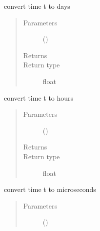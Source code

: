 \documentclass[letterpaper,10pt,english]{sphinxmanual}
\begin{document}
\begin{fulllineitems}
\begin{fulllineitems}
\end{fulllineitems}


\begin{fulllineitems}
\label{\detokenize{Reference:salabim.Environment.to_days}}
convert time t to days
\begin{quote}\begin{description}
\item[{Parameters}] \leavevmode
{} () \textendash{} 

\item[{Returns}] \leavevmode
{}

\item[{Return type}] \leavevmode
float

\end{description}\end{quote}

\end{fulllineitems}


\begin{fulllineitems}
\label{\detokenize{Reference:salabim.Environment.to_hours}}
convert time t to hours
\begin{quote}\begin{description}
\item[{Parameters}] \leavevmode
{} () \textendash{} 

\item[{Returns}] \leavevmode
{}

\item[{Return type}] \leavevmode
float

\end{description}\end{quote}

\end{fulllineitems}


\begin{fulllineitems}
\label{\detokenize{Reference:salabim.Environment.to_microseconds}}
convert time t to microseconds
\begin{quote}\begin{description}
\item[{Parameters}] \leavevmode
{} () \textendash{} 


\end{description}
\end{quote}
\end{fulllineitems}
\end{fulllineitems}
\end{document}
